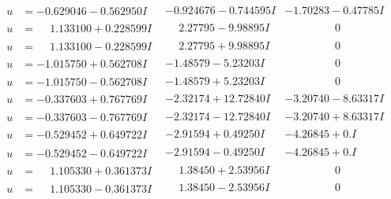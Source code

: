 \documentclass[1p]{elsarticle_modified}
\theoremstyle{definition}
\begin{document}
$$\begin{array}{c|c|c}
\begin{aligned}
u &= -0.629046 - 0.562950 I\end{aligned}
 & -0.924676 - 0.744595 I & -1.70283 - 0.47785 I \\ \hline\begin{aligned}
u &= \phantom{-}1.133100 + 0.228599 I\end{aligned}
 & \phantom{-}2.27795 - 9.98895 I & \phantom{-0.000000 } 0 \\ \hline\begin{aligned}
u &= \phantom{-}1.133100 - 0.228599 I\end{aligned}
 & \phantom{-}2.27795 + 9.98895 I & \phantom{-0.000000 } 0 \\ \hline\begin{aligned}
u &= -1.015750 + 0.562708 I\end{aligned}
 & -1.48579 - 5.23203 I & \phantom{-0.000000 } 0 \\ \hline\begin{aligned}
u &= -1.015750 - 0.562708 I\end{aligned}
 & -1.48579 + 5.23203 I & \phantom{-0.000000 } 0 \\ \hline\begin{aligned}
u &= -0.337603 + 0.767769 I\end{aligned}
 & -2.32174 + 12.72840 I & -3.20740 - 8.63317 I \\ \hline\begin{aligned}
u &= -0.337603 - 0.767769 I\end{aligned}
 & -2.32174 - 12.72840 I & -3.20740 + 8.63317 I \\ \hline\begin{aligned}
u &= -0.529452 + 0.649722 I\end{aligned}
 & -2.91594 + 0.49250 I & -4.26845 + 0. I\phantom{ +0.000000I} \\ \hline\begin{aligned}
u &= -0.529452 - 0.649722 I\end{aligned}
 & -2.91594 - 0.49250 I & -4.26845 + 0. I\phantom{ +0.000000I} \\ \hline\begin{aligned}
u &= \phantom{-}1.105330 + 0.361373 I\end{aligned}
 & \phantom{-}1.38450 + 2.53956 I & \phantom{-0.000000 } 0 \\ \hline\begin{aligned}
u &= \phantom{-}1.105330 - 0.361373 I\end{aligned}
 & \phantom{-}1.38450 - 2.53956 I & \phantom{-0.000000 } 0 \\ \hline\begin{aligned}

\end{aligned}
\end{array}$$
\end{document}
